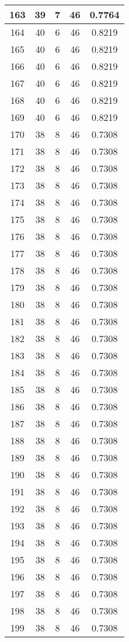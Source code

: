 \documentclass[letterpaper, 12pt]{article}
\begin{document}
\begin{longtable}{|c|c|c|c|c|}
\hline
163 & 39 & 7 & 46 & 0.7764 \\
\hline
164 & 40 & 6 & 46 & 0.8219 \\
\hline
165 & 40 & 6 & 46 & 0.8219 \\
\hline
166 & 40 & 6 & 46 & 0.8219 \\
\hline
167 & 40 & 6 & 46 & 0.8219 \\
\hline
168 & 40 & 6 & 46 & 0.8219 \\
\hline
169 & 40 & 6 & 46 & 0.8219 \\
\hline
170 & 38 & 8 & 46 & 0.7308 \\
\hline
171 & 38 & 8 & 46 & 0.7308 \\
\hline
172 & 38 & 8 & 46 & 0.7308 \\
\hline
173 & 38 & 8 & 46 & 0.7308 \\
\hline
174 & 38 & 8 & 46 & 0.7308 \\
\hline
175 & 38 & 8 & 46 & 0.7308 \\
\hline
176 & 38 & 8 & 46 & 0.7308 \\
\hline
177 & 38 & 8 & 46 & 0.7308 \\
\hline
178 & 38 & 8 & 46 & 0.7308 \\
\hline
179 & 38 & 8 & 46 & 0.7308 \\
\hline
180 & 38 & 8 & 46 & 0.7308 \\
\hline
181 & 38 & 8 & 46 & 0.7308 \\
\hline
182 & 38 & 8 & 46 & 0.7308 \\
\hline
183 & 38 & 8 & 46 & 0.7308 \\
\hline
184 & 38 & 8 & 46 & 0.7308 \\
\hline
185 & 38 & 8 & 46 & 0.7308 \\
\hline
186 & 38 & 8 & 46 & 0.7308 \\
\hline
187 & 38 & 8 & 46 & 0.7308 \\
\hline
188 & 38 & 8 & 46 & 0.7308 \\
\hline
189 & 38 & 8 & 46 & 0.7308 \\
\hline
190 & 38 & 8 & 46 & 0.7308 \\
\hline
191 & 38 & 8 & 46 & 0.7308 \\
\hline
192 & 38 & 8 & 46 & 0.7308 \\
\hline
193 & 38 & 8 & 46 & 0.7308 \\
\hline
194 & 38 & 8 & 46 & 0.7308 \\
\hline
195 & 38 & 8 & 46 & 0.7308 \\
\hline
196 & 38 & 8 & 46 & 0.7308 \\
\hline
197 & 38 & 8 & 46 & 0.7308 \\
\hline
198 & 38 & 8 & 46 & 0.7308 \\
\hline
199 & 38 & 8 & 46 & 0.7308 \\
\hline
\end{longtable}
\end{document}
